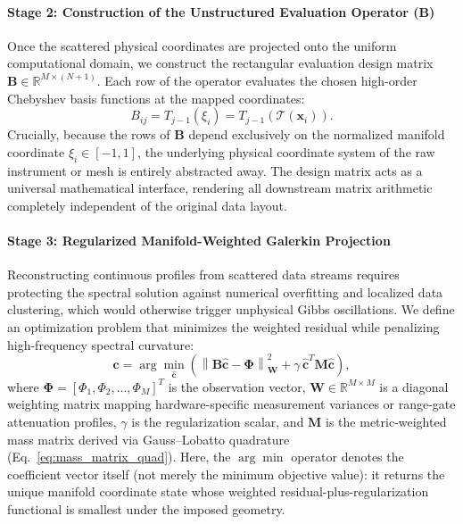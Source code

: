 \paragraph{Stage 2: Construction of the Unstructured Evaluation Operator ($\mathbf{B}$)}
Once the scattered physical coordinates are projected onto the uniform computational domain, we construct the rectangular evaluation design matrix $\mathbf{B} \in \mathbb{R}^{M \times (N+1)}$. Each row of the operator evaluates the chosen high-order Chebyshev basis functions at the mapped coordinates:
\begin{equation}
B_{ij} = T_{j-1}(\xi_i) = T_{j-1}\left(\mathcal{T}(\mathbf{x}_i)\right).
\label{eq:b_matrix_unstructured}
\end{equation}
Crucially, because the rows of $\mathbf{B}$ depend exclusively on the normalized manifold coordinate $\xi_i \in [-1, 1]$, the underlying physical coordinate system of the raw instrument or mesh is entirely abstracted away. The design matrix acts as a universal mathematical interface, rendering all downstream matrix arithmetic completely independent of the original data layout.

\paragraph{Stage 3: Regularized Manifold-Weighted Galerkin Projection}
Reconstructing continuous profiles from scattered data streams requires protecting the spectral solution against numerical overfitting and localized data clustering, which would otherwise trigger unphysical Gibbs oscillations. We define an optimization problem that minimizes the weighted residual while penalizing high-frequency spectral curvature:
\begin{equation}
\mathbf{c} = \arg\min_{\mathbf{\hat{c}}} \left( \left\| \mathbf{B}\mathbf{\hat{c}} - \mathbf{\Phi} \right\|_{\mathbf{W}}^2 + \gamma \, \mathbf{\hat{c}}^{T} \mathbf{M} \mathbf{\hat{c}} \right),
\label{eq:regularized_least_squares}
\end{equation}
where $\mathbf{\Phi} = [\Phi_1, \Phi_2, \dots, \Phi_M]^{T}$ is the observation vector, $\mathbf{W} \in \mathbb{R}^{M \times M}$ is a diagonal weighting matrix mapping hardware-specific measurement variances or range-gate attenuation profiles, $\gamma$ is the regularization scalar, and $\mathbf{M}$ is the metric-weighted mass matrix derived via Gauss--Lobatto quadrature (Eq.~\ref{eq:mass_matrix_quad}).
Here, the $\arg\min$ operator denotes the coefficient vector itself (not merely the minimum objective value): it returns the unique manifold coordinate state whose weighted residual-plus-regularization functional is smallest under the imposed geometry.

